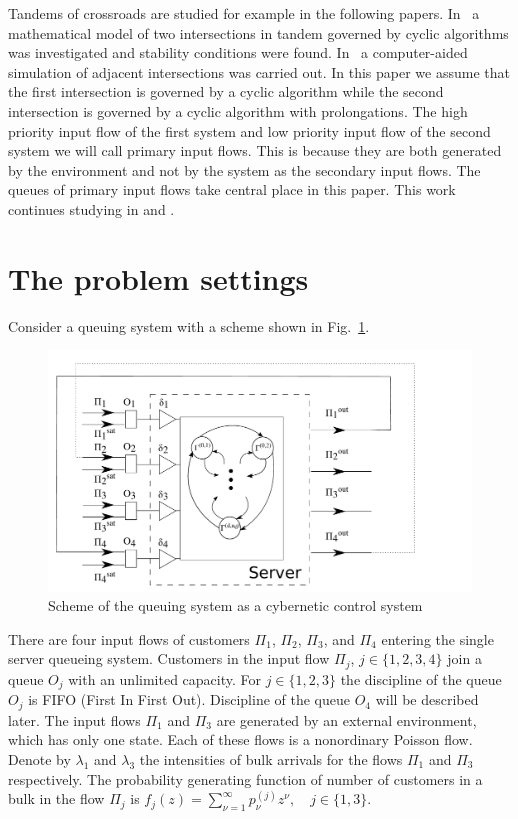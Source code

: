 \documentclass[60x84/16,10pt]{dccn}
\begin{document}
{Tandems of crossroads are studied for example in the following papers. In~\cite{z:2012} a mathematical model of two intersections in tandem governed by cyclic algorithms was investigated and stability conditions were found.
In~\cite{y:l:1985} a computer-aided
simulation of adjacent intersections was carried out.  In this paper we assume that the first intersection is governed by a cyclic algorithm while the second intersection is governed by a cyclic algorithm with prolongations. The high priority input flow of the first system and low priority input flow of the second system we will call primary input flows. This is because they are both generated by the environment and not by the system as the secondary input flows. The queues of primary input flows  take central place in this paper. This work continues studying in \cite{k:z:2016} and \cite{k:z:2016:2}.

\section{The problem settings} 
\label{sec:base-section}
Consider a queuing system with a scheme shown in Fig.~\ref{SystemScheme}.  
\begin{figure}[b]
   \centering
    \includegraphics[width=\textwidth]{SystemScheme.pdf} %
    \caption {Scheme of the queuing system as a cybernetic control system}
    \label{SystemScheme}
\end{figure}
There are four
input flows of customers $\Pi_1$, $\Pi_2$, $\Pi_3$, and $\Pi_4$ entering the single server queueing
system. Customers in the input flow $\Pi_j$, $j \in \{1,2,3,4\}$ join a queue $O_j$ with an
unlimited capacity. For $j \in \{1,2,3\}$ the discipline of the queue $O_j$ is FIFO (First In First
Out). Discipline of the queue $O_4$ will be described later. The input flows $\Pi_1$ and $\Pi_3$ are
generated by an external environment, which has only one state. Each of these flows is a nonordinary
Poisson flow. Denote by $\lambda_1$ and $\lambda_3$ the intensities of bulk arrivals for the flows
$\Pi_1$ and $\Pi_3$ respectively. The probability generating function of number of customers in a
bulk in the flow $\Pi_j$ is $f_j(z) = \sum_{\nu=1}^{\infty} p_{\nu}^{(j)} z ^{\nu}, \quad j\in \{1,3\}.$

}
\end{document}

